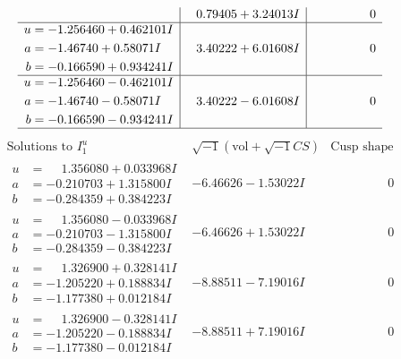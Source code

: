 \documentclass[1p]{elsarticle_modified}
\theoremstyle{definition}
\newcommand{\I}{\sqrt{-1}}
\begin{document}
$$\begin{array}{c|c|c}
 & \phantom{-}0.79405 + 3.24013 I & \phantom{-0.000000 } 0 \\ \hline\begin{aligned}
u &= -1.256460 + 0.462101 I \\
a &= -1.46740 + 0.58071 I \\
b &= -0.166590 + 0.934241 I\end{aligned}
 & \phantom{-}3.40222 + 6.01608 I & \phantom{-0.000000 } 0 \\ \hline\begin{aligned}
u &= -1.256460 - 0.462101 I \\
a &= -1.46740 - 0.58071 I \\
b &= -0.166590 - 0.934241 I\end{aligned}
 & \phantom{-}3.40222 - 6.01608 I & \phantom{-0.000000 } 0\\
 \hline 
 \end{array}$$\newpage$$\begin{array}{c|c|c}  
\text{Solutions to }I^u_{1}& \I (\text{vol} + \sqrt{-1}CS) & \text{Cusp shape}\\
 \hline 
\begin{aligned}
u &= \phantom{-}1.356080 + 0.033968 I \\
a &= -0.210703 + 1.315800 I \\
b &= -0.284359 + 0.384223 I\end{aligned}
 & -6.46626 - 1.53022 I & \phantom{-0.000000 } 0 \\ \hline\begin{aligned}
u &= \phantom{-}1.356080 - 0.033968 I \\
a &= -0.210703 - 1.315800 I \\
b &= -0.284359 - 0.384223 I\end{aligned}
 & -6.46626 + 1.53022 I & \phantom{-0.000000 } 0 \\ \hline\begin{aligned}
u &= \phantom{-}1.326900 + 0.328141 I \\
a &= -1.205220 + 0.188834 I \\
b &= -1.177380 + 0.012184 I\end{aligned}
 & -8.88511 - 7.19016 I & \phantom{-0.000000 } 0 \\ \hline\begin{aligned}
u &= \phantom{-}1.326900 - 0.328141 I \\
a &= -1.205220 - 0.188834 I \\
b &= -1.177380 - 0.012184 I\end{aligned}
 & -8.88511 + 7.19016 I & \phantom{-0.000000 } 0 \\ \hline\begin{aligned}

\end{aligned}
\end{array}$$
\end{document}
